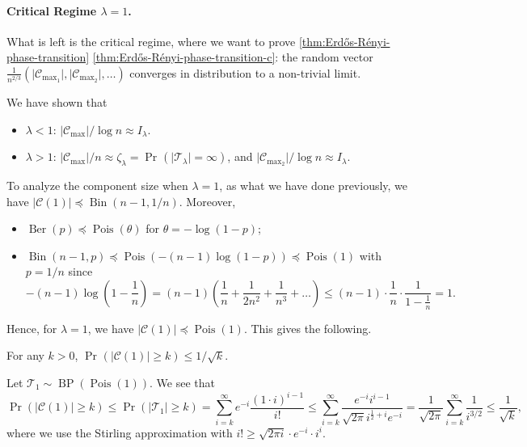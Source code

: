 \paragraph{Critical Regime \(\lambda = 1\).}
What is left is the critical regime, where we want to prove \autoref{thm:Erdős-Rényi-phase-transition} \autoref{thm:Erdős-Rényi-phase-transition-c}: the random vector \(\frac{1}{n^{2 / 3}} (\lvert \mathcal{C} _{\max _1} \rvert , \lvert \mathcal{C} _{\max _2} \rvert , \dots )\) converges in distribution to a non-trivial limit.

\begin{prev}
	We have shown that
	\begin{itemize}
		\item \(\lambda < 1\): \(\lvert \mathcal{C} _{\max } \rvert / \log n \approx I_\lambda \).
		\item \(\lambda > 1\): \(\lvert \mathcal{C} _{\max } \rvert / n \approx \zeta _\lambda = \Pr_{}(\lvert \mathcal{T} _{\lambda } \rvert = \infty ) \), and \(\lvert \mathcal{C} _{\max _2} \rvert / \log n \approx I_\lambda \).
	\end{itemize}
\end{prev}

To analyze the component size when \(\lambda = 1\), as what we have done previously, we have \(\lvert \mathcal{C} (1) \rvert \preceq \operatorname{Bin}(n-1, 1 / n) \). Moreover,
\begin{itemize}
	\item \(\operatorname{Ber}(p) \preceq \operatorname{Pois}(\theta ) \) for \(\theta = - \log (1 - p)\);
	\item \(\operatorname{Bin}(n-1, p) \preceq \operatorname{Pois}(- (n-1) \log (1 - p)) \preceq \operatorname{Pois}(1) \) with \(p = 1 / n\) since
	      \[
		      - (n-1) \log \left( 1 - \frac{1}{n} \right)
		      = (n-1) \left( \frac{1}{n} + \frac{1}{2n^2} + \frac{1}{n^3} + \dots \right)
		      \leq (n-1) \cdot \frac{1}{n} \cdot \frac{1}{1-\frac{1}{n}}
		      = 1.
	      \]
\end{itemize}
Hence, for \(\lambda = 1\), we have \(\lvert \mathcal{C} (1) \rvert \preceq \operatorname{Pois}(1) \). This gives the following.

\begin{claim}
	For any \(k > 0\), \(\Pr_{}(\lvert \mathcal{C} (1) \rvert \geq k) \leq 1 / \sqrt{k} \).
\end{claim}
\begin{explanation}
	Let \(\mathcal{T} _1 \sim \operatorname{BP}(\operatorname{Pois}(1) ) \). We see that
	\[
		\Pr_{}(\lvert \mathcal{C} (1) \rvert \geq k)
		\leq \Pr_{}(\lvert \mathcal{T} _1 \rvert \geq k)
		= \sum_{i=k}^{\infty} e^{-i} \frac{(1 \cdot i)^{i-1}}{i!}
		\leq \sum_{i=k}^{\infty} \frac{e^{-i} i^{i-1}}{\sqrt{2\pi } i^{\frac{1}{2} + i} e^{-i}}
		= \frac{1}{\sqrt{2\pi } } \sum_{i=k}^{\infty} \frac{1}{i^{3 / 2}}
		\leq \frac{1}{\sqrt{k} },
	\]
	where we use the Stirling approximation with \(i! \geq \sqrt{2 \pi i} \cdot e^{-i} \cdot i^i\).
\end{explanation}


